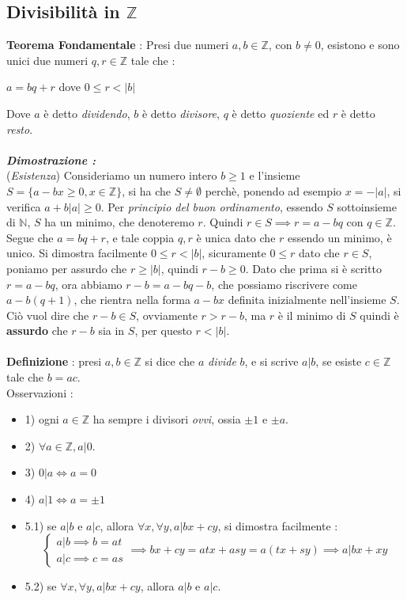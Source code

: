 \documentclass[12pt, letterpaper]{article}
\begin{document}
\subsection{Divisibilità in \(\mathbb{Z}\)}
\textbf{Teorema Fondamentale} : Presi due numeri \(a,b\in\mathbb{Z}\), con \(b\ne0\), esistono e sono unici due 
numeri \(q,r\in\mathbb{Z}\) tale che :\begin{center}
    \(a=bq+r\) dove \(0\le r < |b|\)
\end{center}
Dove \(a\) è detto \textit{dividendo}, \(b\) è detto \textit{divisore}, \(q\) è detto \textit{quoziente} ed
\(r\) è detto \textit{resto}.\\ \hphantom{.}\\ \textbf{\textit{Dimostrazione :}}\\
(\textit{Esistenza}) Consideriamo un numero intero \(b\ge1\) e l'insieme \(S=\{a-bx\ge0,x\in \mathbb{Z}\}\), si 
ha che \(S\ne\emptyset\) perchè, ponendo ad esempio \(x=-|a|\), si verifica \(a+b|a|\ge 0\). Per \textit{principio del 
buon ordinamento}, essendo \(S\) sottoinsieme di \(\mathbb{N}\), \(S\) ha un minimo, che denoteremo \(r\). Quindi 
\(r\in S \implies r= a-bq\) con \(q\in\mathbb{Z}\). Segue che \(a=bq+r\), e tale coppia \(q,r\) è unica dato che 
\(r\) essendo un minimo, è unico. Si dimostra facilmente \(0\le r < |b|\), sicuramente \(0\le r\) dato 
che \(r\in S\), poniamo per assurdo che \(r\ge |b|\), quindi \(r-b\ge 0\). 
Dato che prima si è scritto \( r= a-bq\), ora abbiamo  \( r-b= a-bq-b\), che possiamo riscrivere come 
\(a-b(q+1)\), che rientra nella forma \(a-bx\) definita inizialmente nell'insieme \(S\). Ciò vuol dire che 
\(r-b\in  S\), ovviamente \(r>r-b\), ma \(r\) è il minimo di \(S\) quindi è \textbf{assurdo} che \(r-b\) sia 
in \(S\), per questo \(r<|b|\).\\\hphantom{.}\\
\textbf{Definizione }: presi \(a,b\in\mathbb{Z}\) si dice che \(a\) \textit{divide} \(b\), e si scrive 
\(a|b\), se esiste \(c\in\mathbb{Z}\) tale che \(b=ac\).\\
Osservazioni :\begin{itemize}
    \item 1) ogni \(a\in\mathbb{Z}\) ha sempre i divisori \textit{ovvi}, ossia \(\pm 1\) e \(\pm a\).
    \item 2) \(\forall a\in\mathbb{Z}, a|0\).
    \item 3) \(0|a \iff a=0\)
    \item 4) \(a|1 \iff a=\pm 1\)
    \item 5.1) se \(a|b\) e \(a|c\), allora \(\forall x,\forall y,a|bx+cy\), si dimostra facilmente :\begin{equation}
        \begin{cases}
            a|b \implies b = at
            \\a|c \implies c = as
        \end{cases}\implies bx+cy = atx+asy=a(tx+sy)\implies a|bx+xy
    \end{equation}
    \item 5.2) se \(\forall x,\forall y,a|bx+cy\), allora \(a|b\) e \(a|c\).
\end{itemize}
\end{document}
